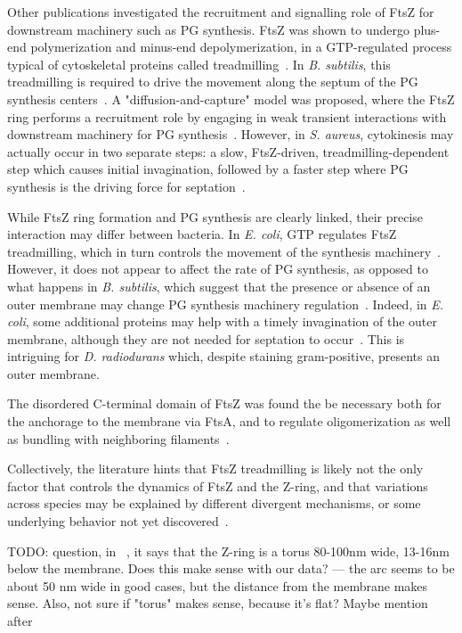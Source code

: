 Other publications investigated the recruitment and signalling role of FtsZ for downstream machinery such as PG synthesis.
FtsZ was shown to undergo plus-end polymerization and minus-end depolymerization, in a GTP-regulated process typical of cytoskeletal proteins called treadmilling~\cite{looseBacterialCellDivision2014}.
In \textit{B. subtilis}, this treadmilling is required to drive the movement along the septum of the PG synthesis centers~\cite{bisson-filhoTreadmillingFtsZFilaments2017}.
A "diffusion-and-capture" model was proposed, where the FtsZ ring performs a recruitment role by engaging in weak transient interactions with downstream machinery for PG synthesis~\cite{baranovaDiffusionCapturePermits2020}.
However, in \textit{S. aureus}, cytokinesis may actually occur in two separate steps: a slow, FtsZ-driven, treadmilling-dependent step which causes initial invagination, followed by a faster step where PG synthesis is the driving force for septation~\cite{monteiroPeptidoglycanSynthesisDrives2018}.

While FtsZ ring formation and PG synthesis are clearly linked, their precise interaction may differ between bacteria.
In \textit{E. coli}, GTP regulates FtsZ treadmilling, which in turn controls the movement of the synthesis machinery~\cite{yangGTPaseActivityCoupled2017}.
However, it does not appear to affect the rate of PG synthesis, as opposed to what happens in \textit{B. subtilis}, which suggest that the presence or absence of an outer membrane may change PG synthesis machinery regulation~\cite{yangGTPaseActivityCoupled2017}.
Indeed, in \textit{E. coli}, some additional proteins may help with a timely invagination of the outer membrane, although they are not needed for septation to occur~\cite{gerdingTransenvelopeTolPal2007}.
This is intriguing for \textit{D. radiodurans} which, despite staining gram-positive, presents an outer membrane.

The disordered C-terminal domain of FtsZ was found the be necessary both for the anchorage to the membrane via FtsA, and to regulate oligomerization as well as bundling with neighboring filaments~\cite{barrowsFtsZDynamicsBacterial2021}.

Collectively, the literature hints that FtsZ treadmilling is likely not the only factor that controls the dynamics of FtsZ and the Z-ring, and that variations across species may be explained by different divergent mechanisms, or some underlying behavior not yet discovered~\cite{barrowsFtsZDynamicsBacterial2021}.

TODO: question, in ~\cite{mcquillenInsightsStructureFunction2020}, it says that the Z-ring is a torus 80-100nm wide, 13-16nm below the membrane. Does this make sense with our data? --- the arc seems to be about 50 nm wide in good cases, but the distance from the membrane makes sense. Also, not sure if "torus" makes sense, because it's flat? Maybe mention after

